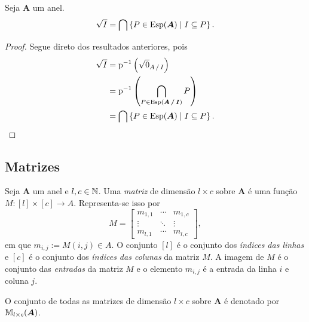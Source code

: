 \begin{proposition}
Seja $\bm A$ um anel.
	\begin{equation*}
	\sqrt{I} = \bigcap \left\{{P \in \operatorname{Esp}(\bm A)}\;\middle\vert\;{I \subseteq P}\right\}.
	\end{equation*}
\end{proposition}
\begin{proof}

Segue direto dos resultados anteriores, pois
	\begin{align*}
	\rad{I} &= \proj\inv \left( \rad{0}_{\quo{A}{I}} \right) \\
		&=\proj\inv \left( \bigcap_{P \in \Esp(\bm {\quo{A}{I}})} P \right) \\
		&= \bigcap \set{P \in \Esp(\bm A)}{I \subseteq P}.
		\qedhere
	\end{align*}
\end{proof}




\subsection{Matrizes}

\begin{definition}
	Seja $\bm A$ um anel e $l,c \in \mathbb{N}$. Uma \emph{matriz} de dimensão $l \times c$ sobre $\bm A$ é uma função $M: [l] \times [c] \to A$. Representa-se isso por
	\begin{equation*}
	M =
	\begin{bmatrix}
	m_{1,1} & \cdots & m_{1,c} \\
	\vdots & \ddots & \vdots \\
	m_{l,1} & \cdots & m_{l,c}
	\end{bmatrix},
	\end{equation*}
em que $m_{i,j} := M(i,j) \in A$. O conjunto $[l]$ é o conjunto dos \emph{índices das linhas} e $[c]$ é o conjunto dos \emph{índices das colunas} da matriz $M$. A imagem de $M$ é o conjunto das \emph{entradas} da matriz $M$ e o elemento $m_{i,j}$ é a entrada da linha $i$ e coluna $j$.

	O conjunto de todas as matrizes de dimensão $l \times c$ sobre $\bm A$ é denotado por $\mathbb{M}_{l \times c}(\bm A)$.
\end{definition}

